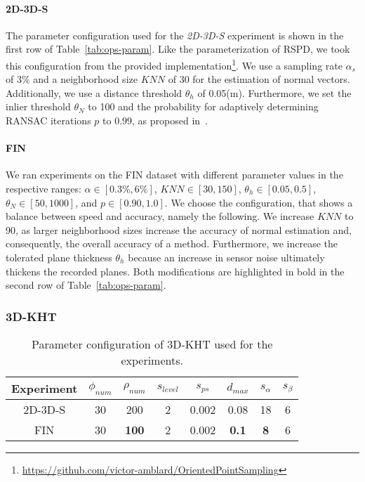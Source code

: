 \documentclass[main.tex]{subfiles}
\begin{document}
\paragraph{2D-3D-S}
The parameter configuration used for the \textit{2D-3D-S} experiment is shown in the first row of Table~\ref{tab:ops-param}.
Like the parameterization of RSPD, we took this configuration from the provided implementation\footnote{\href{https://github.com/victor-amblard/OrientedPointSampling}{https://github.com/victor-amblard/OrientedPointSampling}}.
We use a sampling rate $\alpha_s$ of 3\% and a neighborhood size $KNN$ of 30 for the estimation of normal vectors.
Additionally, we use a distance threshold $\theta_h$ of 0.05(m).
Furthermore, we set the inlier threshold $\theta_N$ to 100 and the probability for adaptively determining RANSAC iterations
$p$ to $0.99$, as proposed in~\cite[Section~4A]{Sun_Mordohai_2019}.

\paragraph{FIN}
We ran experiments on the FIN dataset with different parameter values in the respective ranges:
$\alpha\in[0.3\%, 6\%]$, $KNN\in[30, 150]$, $\theta_h\in[0.05, 0.5]$, $\theta_N\in[50, 1000]$, and $p\in[0.90, 1.0]$.
We choose the configuration, that shows a balance between speed and accuracy, namely the following.
We increase $KNN$ to 90, as larger neighborhood sizes increase the accuracy of normal estimation and,
consequently, the overall accuracy of a method.
Furthermore, we increase the tolerated plane thickness $\theta_h$ because an increase in sensor noise ultimately thickens the recorded planes.
Both modifications are highlighted in bold in the second row of Table~\ref{tab:ops-param}.

\subsubsection{3D-KHT}
\begin{table}[H]
    \centering
    \begin{tabular}{c|ccccccc}
        Experiment & $\phi_{num}$ & $\rho_{num}$ & $s_{level}$ & $s_{ps}$ & $d_{max}$    & $s_\alpha$ & $s_\beta$ \\ \hline
        2D-3D-S    & 30           & 200          & 2           & 0.002    & 0.08         & 18         & 6         \\
        FIN        & 30           & \textbf{100} & 2           & 0.002    & \textbf{0.1} & \textbf{8} & 6
    \end{tabular}%
    \caption{Parameter configuration of 3D-KHT used for the experiments.}
    \label{tab:3dkht-param}
\end{table}
\end{document}
